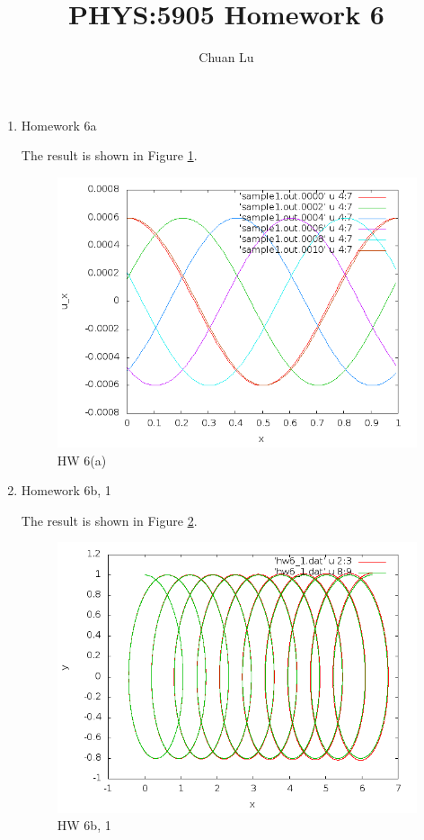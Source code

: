 \documentclass{article}
\begin{document}
\author{Chuan Lu}
\title{PHYS:5905 Homework 6}
\maketitle

\medskip

\begin{enumerate}
\item Homework 6a

The result is shown in Figure \ref{hw6a}.

\begin{figure}[h]
\centering
\includegraphics[scale=0.4]{sample.png}
\caption{HW 6(a)}
\label{hw6a}
\end{figure}

\item Homework 6b, 1

The result is shown in Figure \ref{hw6b-1}.

\begin{figure}[h]
\centering
\includegraphics[scale=0.4]{hw6b_1.png}
\caption{HW 6b, 1}
\label{hw6b-1}
\end{figure}


\end{enumerate}
\end{document}
